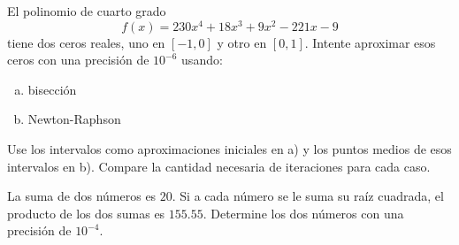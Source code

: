 \documentclass[11pt]{article}
\begin{document}
\begin{question} %
El polinomio de cuarto grado
\[ f(x) = 230 x^4 + 18 x^3 + 9 x^2 - 221 x - 9 \]
tiene dos ceros reales, uno en $[-1, 0]$ y otro en $[0, 1]$. Intente aproximar esos ceros con una precisión de $10^{-6}$ usando:
\begin{enumerate}[a)]
    \item bisección
    \item Newton-Raphson
\end{enumerate}
Use los intervalos como aproximaciones iniciales en a) y los puntos medios de esos intervalos en b). Compare la cantidad necesaria de iteraciones para cada caso.
\end{question}

\begin{question} %
    La suma de dos números es $20$. Si a cada número se le suma su raíz cuadrada, el producto de los dos sumas es $155.55$. Determine los dos números con una precisión de $10^{-4}$.
\end{question}
\end{document}
